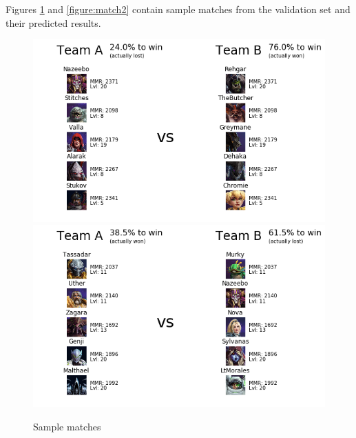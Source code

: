 \documentclass[twoside,twocolumn]{article}
\begin{document}
Figures \ref{figure:match1} and \ref{figure:match2} contain sample matches from the validation set and their predicted results.

\begin{figure}
\caption{Sample matches}
\label{figure:match1}
\includegraphics[width=\linewidth]{match1}
\includegraphics[width=\linewidth]{match2}
\centering
\end{figure}
\end{document}
